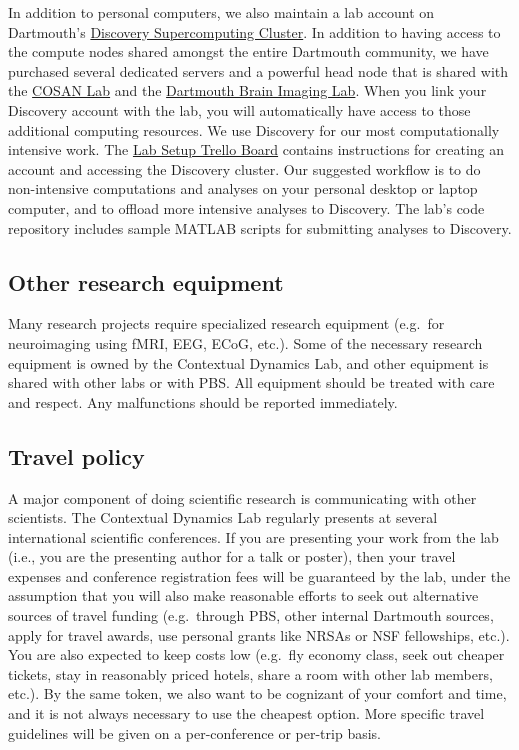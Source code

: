 \documentclass{tufte-book} %
\begin{document}
In addition to personal computers, we also maintain a lab account on
Dartmouth's \href{http://techdoc.dartmouth.edu/discovery/}{Discovery
  Supercomputing Cluster}.  In addition to having access to the
compute nodes shared amongst the entire Dartmouth community, we have
purchased several dedicated servers and a powerful head node that is
shared with the \href{http://www.cosanlab.com/}{COSAN Lab} and the
\href{http://www.dartmouth.edu/~bil/}{Dartmouth Brain Imaging Lab}.
When you link your Discovery account with the lab, you will
automatically have access to those additional computing resources.  We
use Discovery for our most computationally intensive work.  The
\href{https://trello.com/b/Mgs45iEJ/lab-setup}{Lab Setup Trello Board}
contains instructions for creating an account and accessing the
Discovery cluster.  Our suggested workflow is to do non-intensive
computations and analyses on your personal desktop or laptop computer,
and to offload more intensive analyses to Discovery.  The lab's code
repository includes sample MATLAB scripts for submitting analyses to
Discovery.

 \subsection{Other research equipment}
Many research projects require specialized research equipment
(e.g.\ for neuroimaging using fMRI, EEG, ECoG, etc.).  Some of the
necessary research equipment is owned by the Contextual Dynamics Lab,
and other equipment is shared with other labs or with PBS.  All
equipment should be treated with care and respect.  Any malfunctions
should be reported immediately.

 \subsection{Travel policy}
 A major component of doing scientific research is communicating with
 other scientists.  The Contextual Dynamics Lab regularly presents at
 several international scientific conferences.  If you are presenting
 your work from the lab (i.e., you are the presenting author for a
 talk or poster), then your travel expenses and conference
 registration fees will be guaranteed by the lab, under the assumption
 that you will also make reasonable efforts to seek out alternative
 sources of travel funding (e.g.\ through PBS, other internal
 Dartmouth sources, apply for travel awards, use personal grants like
 NRSAs or NSF fellowships, etc.).  You are also expected to keep costs
 low (e.g.\ fly economy class, seek out cheaper tickets, stay in
 reasonably priced hotels, share a room with other lab members, etc.).
 By the same token, we also want to be cognizant of your comfort and
 time, and it is not always necessary to use the cheapest option.
 More specific travel guidelines will be given on a per-conference or
 per-trip basis.
\end{document}

